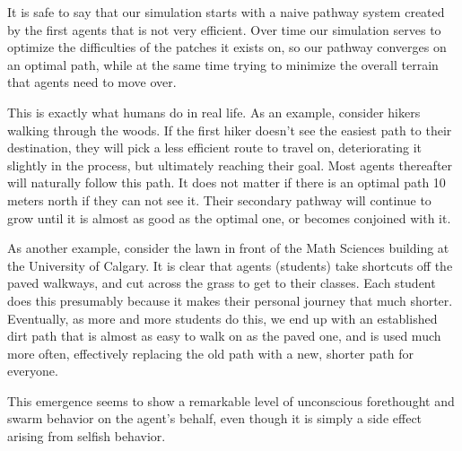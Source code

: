 \documentclass[conference]{IEEEtran}
\begin{document}
	It is safe to say that our simulation starts with a naive pathway system created by the first agents that is not very efficient. Over time our simulation serves to optimize the difficulties of the patches it exists on, so our pathway converges on an optimal path, while at the same time trying to minimize the overall terrain that agents need to move over.
	
This is exactly what humans do in real life. As an example, consider hikers walking through the woods. If the first hiker doesn't see the easiest path to their destination, they will pick a less efficient route to travel on, deteriorating it slightly in the process, but ultimately reaching their goal. Most agents thereafter will naturally follow this path. It does not matter if there is an optimal path 10 meters north if they can not see it. Their secondary pathway will continue to grow until it is almost as good as the optimal one, or becomes conjoined with it.

As another example, consider the lawn in front of the Math Sciences building at the University of Calgary. It is clear that agents (students) take shortcuts off the paved walkways, and cut across the grass to get to their classes. Each student does this presumably because it makes their personal journey that much shorter. Eventually, as more and more students do this, we end up with an established dirt path that is almost as easy to walk on as the paved one, and is used much more often, effectively replacing the old path with a new, shorter path for everyone. 

This emergence seems to show a remarkable level of unconscious forethought and swarm behavior on the agent's behalf, even though it is simply a side effect arising from selfish behavior. 

%
%
\end{document}
